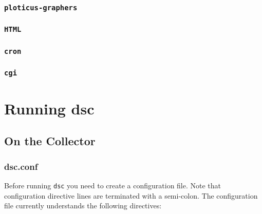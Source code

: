 \documentclass{report}
\def\dsc{{\sc dsc}}
\begin{document}
\subsection{\tt ploticus-graphers}

\subsection{\tt HTML}

\subsection{\tt cron}

\subsection{\tt cgi}

\chapter{Running {\dsc}}

\section{On the Collector}

\subsection{dsc.conf}

Before running {\tt dsc\/} you need to create a configuration file.
Note that configuration directive lines are terminated with a semi-colon.
The configuration file currently understands the following directives:
\end{document}

